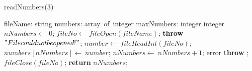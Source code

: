 \documentclass[a4paper,10pt]{article}
\begin{document}
\begin{algorithm}
\caption{readNumbers(3)}
\begin{algorithmic}[5]
\State {}
\State {}
\State {}
    \State fileName: string
    \State numbers: array\ of\ integer
    \State maxNumbers: integer
  \EndDecl
    \State integer
  \EndDecl
  \State \(nNumbers\gets\ 0\);
  \State \(fileNo\gets\ fileOpen(fileName)\);
    \State \textbf{throw} \("File could not be opened!"\);
  \EndIf
  \Try
      \State \(number\gets\ fileReadInt(fileNo)\);
      \State \(numbers[nNumbers]\gets\ number\);
      \State \(nNumbers\gets\ nNumbers+1\);
    \EndWhile
  \EndTry
  \Catch error
    \State \textbf{throw} \(\);
  \EndCatch %
  \Finally
    \State \(fileClose(fileNo)\);
  \EndFinally
  \State \textbf{return} \(nNumbers\);
\EndFunction
\end{algorithmic}
\end{algorithm}
\end{document}
